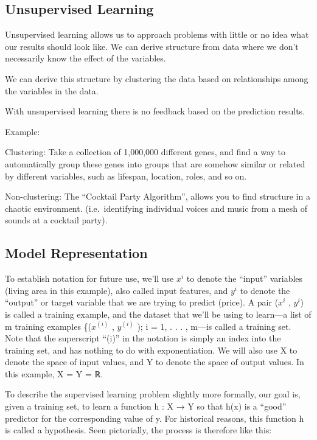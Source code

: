 \documentclass[
]{article}
\begin{document}
\hypertarget{unsupervised-learning}{%
\subsection{Unsupervised Learning}\label{unsupervised-learning}}

Unsupervised learning allows us to approach problems with little or no
idea what our results should look like. We can derive structure from
data where we don't necessarily know the effect of the variables.

We can derive this structure by clustering the data based on
relationships among the variables in the data.

With unsupervised learning there is no feedback based on the prediction
results.

Example:

Clustering: Take a collection of 1,000,000 different genes, and find a
way to automatically group these genes into groups that are somehow
similar or related by different variables, such as lifespan, location,
roles, and so on.

Non-clustering: The ``Cocktail Party Algorithm'', allows you to find
structure in a chaotic environment. (i.e.~identifying individual voices
and music from a mesh of sounds at a cocktail party).

\hypertarget{model-representation}{%
\subsection{Model Representation}\label{model-representation}}

To establish notation for future use, we'll use \(x^{i}\) to denote the
``input'' variables (living area in this example), also called input
features, and \(y^{i}\) to denote the ``output'' or target variable that
we are trying to predict (price). A pair (\(x^{i}\) , \(y^{i}\)) is
called a training example, and the dataset that we'll be using to
learn---a list of m training examples \{(\(x^{(i)}\) , \(y^{(i)}\) ); i
= 1, . . . , m---is called a training set. Note that the superscript
``(i)'' in the notation is simply an index into the training set, and
has nothing to do with exponentiation. We will also use X to denote the
space of input values, and Y to denote the space of output values. In
this example, X = Y = ℝ.

To describe the supervised learning problem slightly more formally, our
goal is, given a training set, to learn a function h : X → Y so that
h(x) is a ``good'' predictor for the corresponding value of y. For
historical reasons, this function h is called a hypothesis. Seen
pictorially, the process is therefore like this:
\end{document}
